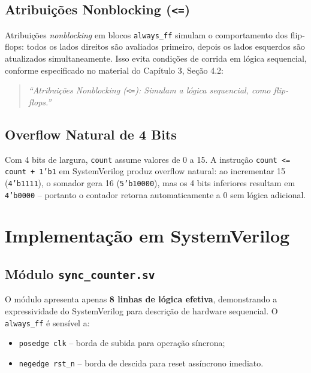 \documentclass[12pt,a4paper]{article}
\begin{document}
\subsection{Atribuições Nonblocking (\texttt{<=})}

Atribuições \textit{nonblocking} em blocos \texttt{always\_ff} simulam
o comportamento dos flip-flops: todos os lados direitos são avaliados
primeiro, depois os lados esquerdos são atualizados simultaneamente.
Isso evita condições de corrida em lógica sequencial, conforme especificado
no material do Capítulo 3, Seção 4.2:

\begin{quote}
  \itshape ``Atribuições Nonblocking (\texttt{<=}): Simulam a lógica sequencial,
  como flip-flops.''
\end{quote}

\subsection{Overflow Natural de 4 Bits}

Com 4 bits de largura, \texttt{count} assume valores de 0 a 15. A instrução
\texttt{count <= count + 1'b1} em SystemVerilog produz overflow natural:
ao incrementar 15 (\texttt{4'b1111}), o somador gera 16 (\texttt{5'b10000}),
mas os 4 bits inferiores resultam em \texttt{4'b0000} -- portanto o contador
retorna automaticamente a 0 sem lógica adicional.

\section{Implementação em SystemVerilog}

\subsection{Módulo \texttt{sync\_counter.sv}}



O módulo apresenta apenas \textbf{8 linhas de lógica efetiva}, demonstrando a
expressividade do SystemVerilog para descrição de hardware sequencial. O
\texttt{always\_ff} é sensível a:
\begin{itemize}[leftmargin=1.5cm]
  \item \texttt{posedge clk} -- borda de subida para operação síncrona;
  \item \texttt{negedge rst\_n} -- borda de descida para reset assíncrono imediato.
\end{itemize}
\end{document}
